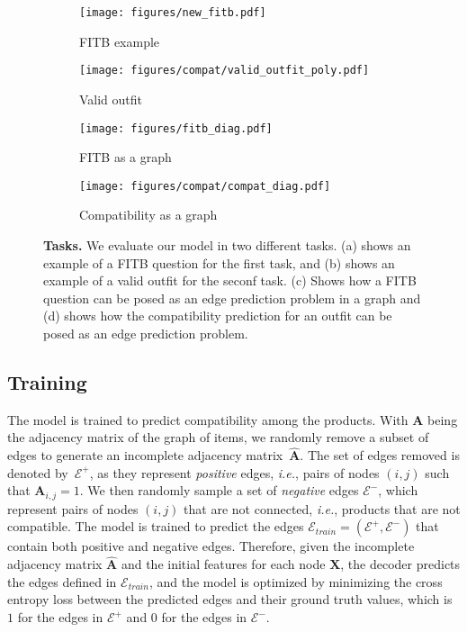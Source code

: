 \documentclass[10pt,twocolumn,letterpaper]{article}
\begin{document}
\begin{figure*}[t]
\begin{center}
\begin{subfigure}{.28\textwidth}
  \centering
  \texttt{[image: figures/new\_fitb.pdf]}
  \caption{FITB example}
  \label{fig:fitb_examplea}
\end{subfigure}\hspace{1em}
\begin{subfigure}{.23\textwidth}
  \centering
  \texttt{[image: figures/compat/valid\_outfit\_poly.pdf]}
  \caption{Valid outfit}
  \label{fig:valid_outfit}
\end{subfigure}\hspace{1em}
\begin{subfigure}{.23\textwidth}
  \centering
  \texttt{[image: figures/fitb\_diag.pdf]}
  \caption{FITB as a graph}
  \label{fig:fitb_graph}
\end{subfigure}
\begin{subfigure}{.20\linewidth}
  \centering
  \texttt{[image: figures/compat/compat\_diag.pdf]}
  \caption{Compatibility as a graph}
  \label{fig:compat_graph}
\end{subfigure}
\end{center}
\caption{\textbf{Tasks.} We evaluate our model in two different tasks. (a) shows an example of a FITB question for the first task, and (b) shows an example of a valid outfit for the seconf task. (c) Shows how a FITB question can be posed as an edge prediction problem in a graph and (d) shows how the compatibility prediction for an outfit can be posed as an edge prediction problem.}
\end{figure*}

\subsection{Training}
\label{sseq:training}
The model is trained to predict compatibility among the products. With $\boldsymbol{A}$ being the adjacency matrix of the graph of items, we randomly remove a subset of edges to generate an incomplete adjacency matrix~$\boldsymbol{\hat{A}}$. The set of edges removed is denoted by~$\mathcal{E}^+$, as they represent \textit{positive} edges, \textit{i.e.}, pairs of nodes $(i,j)$ such that $\boldsymbol{A}_{i,j} = 1$. We then randomly sample a set of \textit{negative} edges $\mathcal{E}^-$, which represent pairs of nodes $(i, j)$ that are not connected, \textit{i.e.}, products that are not compatible. The model is trained to predict the edges $\mathcal{E}_{train} = (\mathcal{E}^+, \mathcal{E}^-)$ that contain both positive and negative edges. Therefore, given the incomplete adjacency matrix $\boldsymbol{\hat{A}}$ and the initial features for each node $\boldsymbol{X}$, the decoder predicts the edges defined in $\mathcal{E}_{train}$, and the model is optimized by minimizing the cross entropy loss between the predicted edges and their ground truth values, which is $1$ for the edges in $\mathcal{E}^+$ and $0$ for the edges in $\mathcal{E}^-$.
\end{document}
